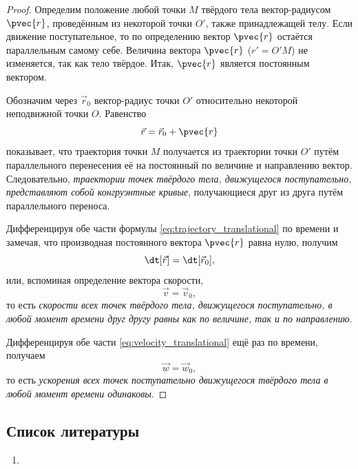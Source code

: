 \begin{proof}
  Определим положение любой точки $M$ твёрдого тела вектор-радиусом $\pvec{r}$,
  проведённым из некоторой точки $O'$, также принадлежащей телу. Если движение
  поступательное, то по определению вектор $\pvec{r}$ остаётся параллельным
  самому себе. Величина вектора $\pvec{r}$ ($r' = O'M$) не изменяется, так как
  тело твёрдое. Итак, $\pvec{r}$ является постоянным вектором.

  Обозначим через $\vec{r}_0$ вектор-радиус точки $O'$ относительно некоторой
  неподвижной точки $O$. Равенство
  \begin{equation}
    \label{eq:trajectory_translational}
    \vec{r} = \vec{r}_0 + \pvec{r}
  \end{equation}
  показывает, что траектория точки $M$ получается из траектории точки $O'$ путём
  параллельного перенесения её на постоянный по величине и направлению вектор.
  Следовательно, \textit{траектории точек твёрдого тела, движущегося
  поступательно, представляют собой конгруэнтные кривые}, получающиеся друг из
  друга путём параллельного переноса.

  Дифференцируя обе части формулы \ref{eq:trajectory_translational} по времени и
  замечая, что производная постоянного вектора $\pvec{r}$ равна нулю, получим
  \begin{equation*}
    \dt[\vec{r}] = \dt[\vec{r}_0],
  \end{equation*}
  или, вспоминая определение вектора скорости,
  \begin{equation}
    \label{eq:velocity_translational}
    \vec{v} = \vec{v}_0,
  \end{equation}
  то есть \textit{скорости всех точек твёрдого тела, движущегося поступательно,
  в любой момент времени друг другу равны как по величине, так и по
  направлению}.

  Дифференцируя обе части \ref{eq:velocity_translational} ещё раз по времени,
  получаем
  \begin{equation}
    \label{eq:acceleration_translational}
    \vec{w} = \vec{w}_0,
  \end{equation}
  то есть \textit{ускорения всех точек поступательно движущегося твёрдого тела в
  любой момент времени одинаковы}.
\end{proof}

\subsection{Список литературы}
\begin{enumerate}
  \item \cite{lourie}
\end{enumerate}

